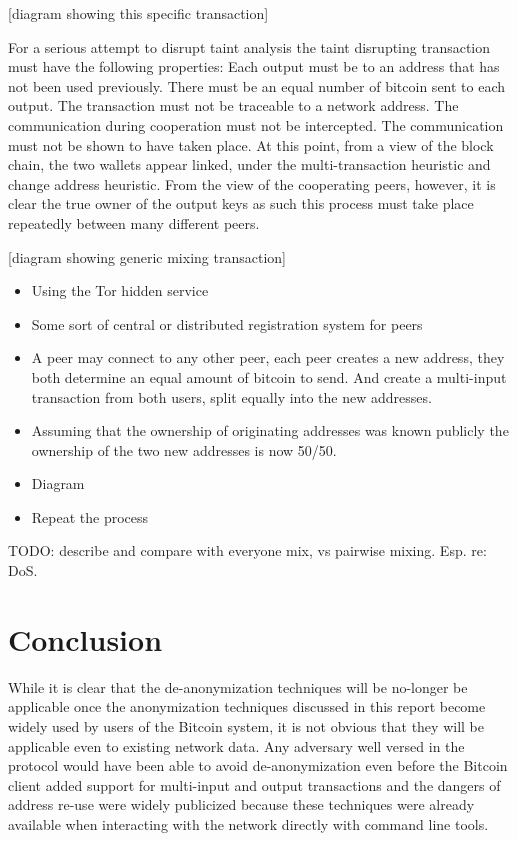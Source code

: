 [diagram showing this specific transaction]

For a serious attempt to disrupt taint analysis the taint disrupting transaction must have the following properties:  Each output must be to an address that has not been used previously. There must be an equal number of bitcoin sent to each output. The transaction must not be traceable to a network address.  The communication during cooperation must not be intercepted. The communication must not be shown to have taken place.  At this point, from a view of the block chain, the two wallets appear linked, under the multi-transaction heuristic and change address heuristic. From the view of the cooperating peers, however, it is clear the true owner of the output keys as such this process must take place repeatedly between many different peers.

[diagram showing generic mixing transaction]

\begin{itemize} \item Using the Tor hidden service \item Some sort of central or
        distributed registration system for peers \item A peer may connect to
            any other peer, each peer creates a new address, they both determine
            an equal amount of bitcoin to send. And create a multi-input
            transaction from both users, split equally into the new addresses.
\item Assuming that the ownership of originating addresses was known publicly
the ownership of the two new addresses is now 50/50.  \item Diagram \item Repeat
the process
\end{itemize}

TODO: describe and compare with everyone mix, vs pairwise mixing. Esp. re: DoS.

\section{Conclusion}
While it is clear that the de-anonymization techniques will be no-longer be applicable once the anonymization techniques discussed in this report become widely used by users of the Bitcoin system, it is not obvious that they will be applicable even to existing network data. Any adversary well versed in the protocol would have been able to avoid de-anonymization even before the Bitcoin client\cite{bitcoin-qt} added support for multi-input and output transactions and the dangers of address re-use were widely publicized because these techniques were already available when interacting with the network directly with command line tools.


